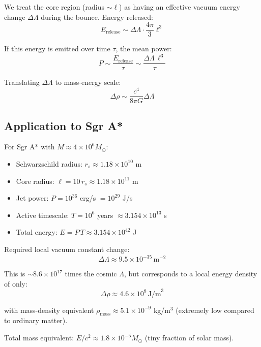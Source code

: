\documentclass[11pt,a4paper]{article}
\begin{document}
We treat the core region (radius $\sim \ell$) as having an effective vacuum energy change $\Delta\Lambda$ during the bounce. Energy released:
\begin{equation}
E_{\text{release}} \sim \Delta\Lambda \cdot \frac{4\pi}{3}\ell^3
\end{equation}

If this energy is emitted over time $\tau$, the mean power:
\begin{equation}
P \sim \frac{E_{\text{release}}}{\tau} \sim \frac{\Delta\Lambda\,\ell^3}{\tau}
\end{equation}

Translating $\Delta\Lambda$ to mass-energy scale:
\begin{equation}
\Delta\rho \sim \frac{c^4}{8\pi G}\Delta\Lambda
\end{equation}

\subsection{Application to Sgr A*}

For Sgr A* with $M \approx 4\times10^6 M_\odot$:
\begin{itemize}
\item Schwarzschild radius: $r_s \approx 1.18\times10^{10}$ m
\item Core radius: $\ell = 10\,r_s \approx 1.18\times10^{11}$ m
\item Jet power: $P = 10^{36}$ erg/s $= 10^{29}$ J/s
\item Active timescale: $T = 10^{6}$ years $\approx 3.154\times10^{13}$ s
\item Total energy: $E = P\,T \approx 3.154\times10^{42}$ J
\end{itemize}

Required local vacuum constant change:
\begin{equation}
\Delta\Lambda \approx 9.5\times10^{-35}\,\text{m}^{-2}
\end{equation}

This is $\sim 8.6\times10^{17}$ times the cosmic $\Lambda$, but corresponds to a local energy density of only:
\begin{equation}
\Delta\rho \approx 4.6\times10^{8}\,\text{J/m}^3
\end{equation}

with mass-density equivalent $\rho_{\text{mass}} \approx 5.1\times10^{-9}$ kg/m$^3$ (extremely low compared to ordinary matter).

Total mass equivalent: $E/c^2 \approx 1.8\times10^{-5} M_\odot$ (tiny fraction of solar mass).
\end{document}
